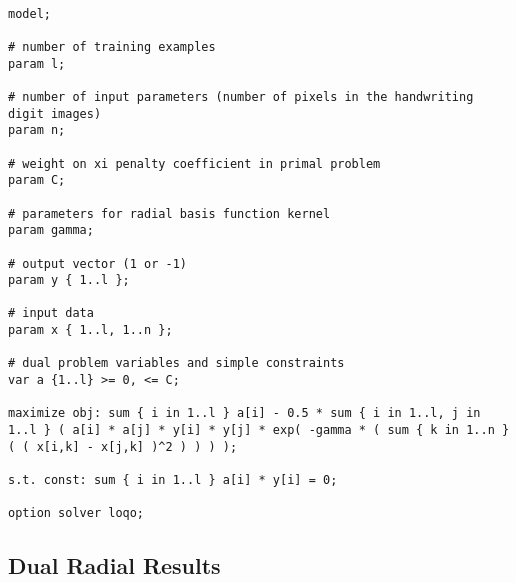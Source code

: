 \documentclass{article}
\begin{document}
\begin{verbatim}

model;

# number of training examples
param l;

# number of input parameters (number of pixels in the handwriting digit images)
param n;

# weight on xi penalty coefficient in primal problem
param C;

# parameters for radial basis function kernel
param gamma;

# output vector (1 or -1)
param y { 1..l };

# input data
param x { 1..l, 1..n };

# dual problem variables and simple constraints
var a {1..l} >= 0, <= C;

maximize obj: sum { i in 1..l } a[i] - 0.5 * sum { i in 1..l, j in 1..l } ( a[i] * a[j] * y[i] * y[j] * exp( -gamma * ( sum { k in 1..n } ( ( x[i,k] - x[j,k] )^2 ) ) ) );

s.t. const: sum { i in 1..l } a[i] * y[i] = 0;

option solver loqo;

\end{verbatim}

\subsection{Dual Radial Results}
\end{document}
